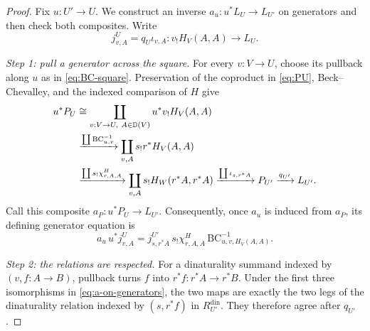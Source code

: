 \begin{proof}
Fix \(u:U'\to U\).  We construct an inverse
\(a_u:u^*L_U\to L_{U'}\) on generators and then check both composites.
Write
\[
  j^U_{v,A}=q_U\iota_{v,A}:v_!H_V(A,A)\longrightarrow L_U.
\]

\emph{Step 1: pull a generator across the square.}
For every \(v:V\to U\), choose its pullback along \(u\) as in
\cref{eq:BC-square}.  Preservation of the coproduct in \cref{eq:PU},
Beck--Chevalley, and the indexed comparison of \(H\) give
\begin{align}
  u^*P_U
  &\cong
  \coprod_{v:V\to U,\ A\in\mathbb{D}(V)}u^*v_!H_V(A,A)
  \\
  &\xrightarrow{\coprod\mathrm{BC}_{u,v}^{-1}}
  \coprod_{v,A}s_!r^*H_V(A,A)
  \\
  &\xrightarrow{\coprod s_!\chi^H_{r,A,A}}
  \coprod_{v,A}s_!H_W(r^*A,r^*A)
  \xrightarrow{\coprod\iota_{s,r^*A}}P_{U'}
  \xrightarrow{q_{U'}}L_{U'}.
  \label{eq:a-on-generators}
\end{align}
Call this composite \(a_P:u^*P_U\to L_{U'}\).
Consequently, once \(a_u\) is induced from \(a_P\), its defining generator
equation is
\begin{equation}
  a_u\,u^*j^U_{v,A}
  =
  j^{U'}_{s,r^*A}\,
  s_!\chi^H_{r,A,A}\,
  \mathrm{BC}_{u,v,H_V(A,A)}^{-1}.
  \label{eq:au-generator}
\end{equation}

\emph{Step 2: the relations are respected.}
For a dinaturality summand indexed by \((v,f:A\to B)\), pullback turns
\(f\) into \(r^*f:r^*A\to r^*B\).  Under the first three isomorphisms in
\cref{eq:a-on-generators}, the two maps are exactly the two legs of the
dinaturality relation indexed by \((s,r^*f)\) in
\(R_{U'}^{\mathrm{din}}\).  They therefore agree after \(q_{U'}\).


\end{proof}
